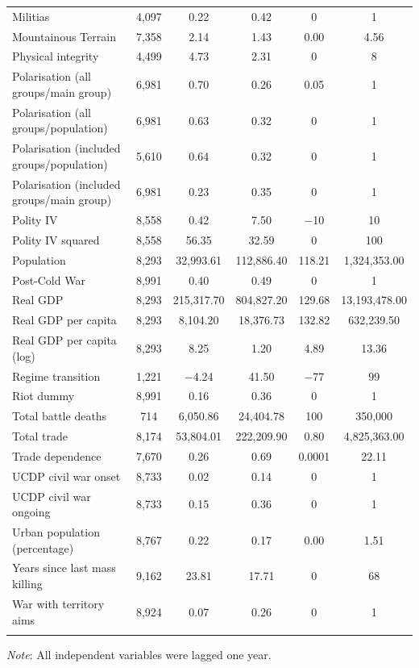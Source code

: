 \documentclass[a4paper,12pt]{article}
\begin{document}
\begin{table}[!htbp]
\begin{tabular}{@{\extracolsep{5pt}}lccccc}
Militias & 4,097 & 0.22 & 0.42 & 0 & 1 \\ 
Mountainous Terrain & 7,358 & 2.14 & 1.43 & 0.00 & 4.56 \\ 
Physical integrity & 4,499 & 4.73 & 2.31 & 0 & 8 \\ 
Polarisation (all groups/main group) & 6,981 & 0.70 & 0.26 & 0.05 & 1 \\ 
Polarisation (all groups/population) & 6,981 & 0.63 & 0.32 & 0 & 1 \\ 
Polarisation (included groups/population) & 5,610 & 0.64 & 0.32 & 0 & 1 \\ 
Polarisation (included groups/main group) & 6,981 & 0.23 & 0.35 & 0 & 1 \\ 
Polity IV & 8,558 & 0.42 & 7.50 & $-$10 & 10 \\ 
Polity IV squared & 8,558 & 56.35 & 32.59 & 0 & 100 \\ 
Population & 8,293 & 32,993.61 & 112,886.40 & 118.21 & 1,324,353.00 \\
Post-Cold War & 8,991 & 0.40 & 0.49 & 0 & 1 \\ 
Real GDP & 8,293 & 215,317.70 & 804,827.20 & 129.68 & 13,193,478.00 \\ 
Real GDP per capita & 8,293 & 8,104.20 & 18,376.73 & 132.82 & 632,239.50 \\ 
Real GDP per capita (log) & 8,293 & 8.25 & 1.20 & 4.89 & 13.36 \\ 
Regime transition & 1,221 & $-$4.24 & 41.50 & $-$77 & 99 \\ 
Riot dummy & 8,991 & 0.16 & 0.36 & 0 & 1 \\ 
Total battle deaths & 714 & 6,050.86 & 24,404.78 & 100 & 350,000 \\  
Total trade & 8,174 & 53,804.01 & 222,209.90 & 0.80 & 4,825,363.00 \\ 
Trade dependence & 7,670 & 0.26 & 0.69 & 0.0001 & 22.11 \\ 
UCDP civil war onset & 8,733 & 0.02 & 0.14 & 0 & 1 \\ 
UCDP civil war ongoing & 8,733 & 0.15 & 0.36 & 0 & 1 \\ 
Urban population (percentage) & 8,767 & 0.22 & 0.17 & 0.00 & 1.51 \\ 
Years since last mass killing & 9,162 & 23.81 & 17.71 & 0 & 68 \\ 
War with territory aims & 8,924 & 0.07 & 0.26 & 0 & 1 \\ 
\hline \\[-1.8ex] 
\end{tabular} 
\raggedright{\newline \textit{Note}: All independent variables were lagged one year.}
\end{table} 
\normalsize
\end{document}
